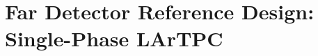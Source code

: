 \chapter{Far Detector Reference Design: Single-Phase LArTPC}
\label{ch:detectors-fd-ref}











